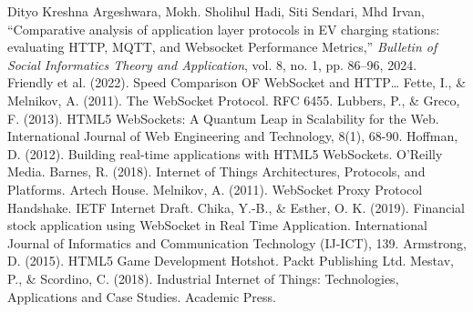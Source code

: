 \documentclass[a4paper, 11pt]{article}
\begin{document}
\begin{thebibliography}{9}
 Dityo Kreshna Argeshwara, Mokh. Sholihul Hadi, Siti Sendari, Mhd Irvan, ``Comparative analysis of application layer protocols in EV charging stations: evaluating HTTP, MQTT, and Websocket Performance Metrics,'' \textit{Bulletin of Social Informatics Theory and Application}, vol. 8, no. 1, pp. 86--96, 2024.
 Friendly et al. (2022). Speed Comparison OF WebSocket and HTTP…
 Fette, I., \& Melnikov, A. (2011). The WebSocket Protocol. RFC 6455.
 Lubbers, P., \& Greco, F. (2013). HTML5 WebSockets: A Quantum Leap in Scalability for the Web. International Journal of Web Engineering and Technology, 8(1), 68-90.
 Hoffman, D. (2012). Building real-time applications with HTML5 WebSockets. O'Reilly Media.
 Barnes, R. (2018). Internet of Things Architectures, Protocols, and Platforms. Artech House.
 Melnikov, A. (2011). WebSocket Proxy Protocol Handshake. IETF Internet Draft.
 Chika, Y.-B., \& Esther, O. K. (2019). Financial stock application using WebSocket in Real Time Application. International Journal of Informatics and Communication Technology (IJ-ICT), 139.
 Armstrong, D. (2015). HTML5 Game Development Hotshot. Packt Publishing Ltd.
 Mestav, P., \& Scordino, C. (2018). Industrial Internet of Things: Technologies, Applications and Case Studies. Academic Press.

\end{thebibliography}
\end{document}
